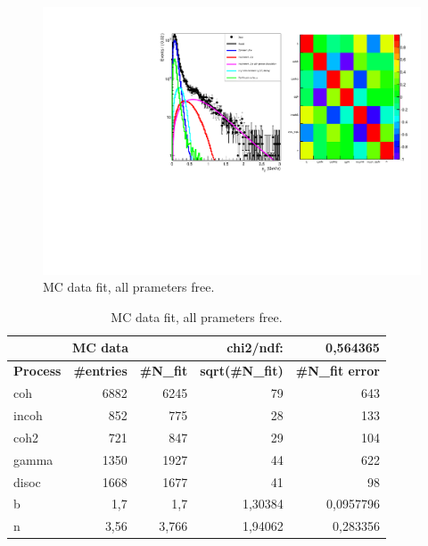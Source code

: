 \documentclass{beamer}
\begin{document}
\begin{frame}

\begin{figure}[!ht]
\centering
 {\includegraphics[width=\textwidth]{0Pt_fit.pdf}
\caption{MC data fit, all prameters free.} 
\label{fig:}}
\end{figure}

\end{frame}
\begin{frame}

\begin{table}[!hb]
\begin{center}
\begin{tabular}{|l|r|r|r|r|}
\hline
\multicolumn{3}{|c|}{\textbf{MC data}} & chi2/ndf: & 0,564365 \\ \hline
\textbf{Process} & \multicolumn{1}{l|}{\textbf{\#entries}} & \multicolumn{1}{l|}{\textbf{\#N\_fit}} & \multicolumn{1}{l|}{\textbf{sqrt(\#N\_fit)}} & \multicolumn{1}{l|}{\textbf{\#N\_fit error}} \\ \hline
coh & 6882 & 6245 & 79 & 643 \\ \hline
incoh & 852 & 775 & 28 & 133 \\ \hline
coh2 & 721 & 847 & 29 & 104 \\ \hline
gamma & 1350 & 1927 & 44 & 622 \\ \hline
disoc & 1668 & 1677 & 41 & 98 \\ \hline
b & 1,7 & 1,7 & 1,30384 & 0,0957796 \\ \hline
n & 3,56 & 3,766 & 1,94062 & 0,283356 \\ \hline
\end{tabular}
\end{center}
\caption{MC data fit, all prameters free.}
\label{}
\end{table}



\end{frame}
\end{document}
